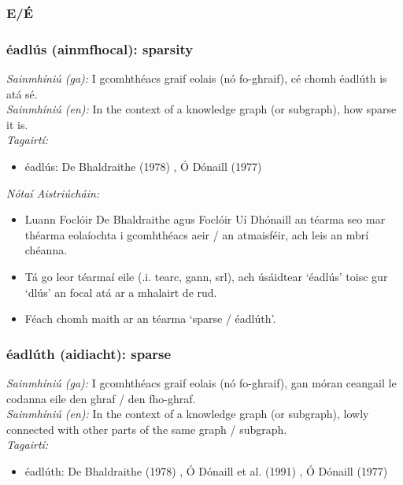  \subsubsection*{E/É}

\subsubsection*{éadlús (ainmfhocal): sparsity}
 \noindent \textit{Sainmhíniú (ga):} I gcomhthéacs graif eolais (nó fo-ghraif), cé chomh éadlúth is atá sé.
\\
 \noindent \textit{Sainmhíniú (en):} In the context of a knowledge graph (or subgraph), how sparse it is.
\\
 \noindent \textit{Tagairtí:}
\begin{itemize}
	\item éadlús: De Bhaldraithe (1978) \cite{de-bhaldraithe}, Ó Dónaill (1977) \cite{odonaill}
\end{itemize}

 \noindent \textit{Nótaí Aistriúcháin:}
\begin{itemize}
	\item Luann Foclóir De Bhaldraithe agus Foclóir Uí Dhónaill an téarma seo  mar théarma eolaíochta i gcomhthéacs aeir / an atmaisféir, ach leis an mbrí chéanna.
	\item Tá go leor téarmaí eile (.i. tearc, gann, srl), ach úsáidtear `éadlús' toisc gur `dlús' an focal atá ar a mhalairt de rud.
	\item Féach chomh maith ar an téarma `sparse / éadlúth'.
\end{itemize}


\subsubsection*{éadlúth (aidiacht): sparse}
 \noindent \textit{Sainmhíniú (ga):} I gcomhthéacs graif eolais (nó fo-ghraif), gan móran ceangail le codanna eile den ghraf / den fho-ghraf.
\\
 \noindent \textit{Sainmhíniú (en):} In the context of a knowledge graph (or subgraph), lowly connected with other parts of the same graph / subgraph.
\\
 \noindent \textit{Tagairtí:}
\begin{itemize}
	\item éadlúth: De Bhaldraithe (1978) \cite{de-bhaldraithe}, Ó Dónaill et al. (1991) \cite{focloir-beag}, Ó Dónaill (1977) \cite{odonaill}
\end{itemize}

